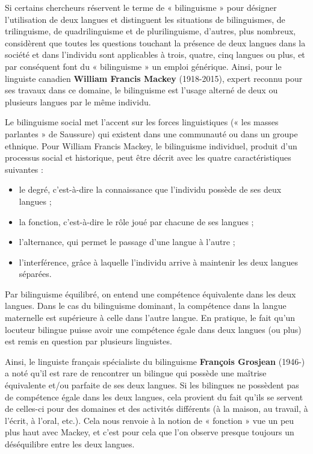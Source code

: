 Si certains chercheurs réservent le terme de « bilinguisme » pour désigner l’utilisation de deux langues et distinguent les situations de bilinguismes, de trilinguisme, de quadrilinguisme et de plurilinguisme, d’autres, plus nombreux, considèrent que toutes les questions touchant la présence de deux langues dans la société et dans l’individu sont applicables à trois, quatre, cinq langues ou plus, et par conséquent font du « bilinguisme » un emploi générique. Ainsi, pour le linguiste canadien \textbf{William Francis Mackey} (1918-2015), expert reconnu pour ses travaux dans ce domaine, le bilinguisme est l’usage alterné de deux ou plusieurs langues par le même individu.

Le bilinguisme social met l’accent sur les forces linguistiques (« les masses parlantes » de Saussure) qui existent dans une communauté ou dans un groupe ethnique. Pour William Francis Mackey, le bilinguisme individuel, produit d’un processus social et historique, peut être décrit avec les quatre caractéristiques suivantes :
\begin{itemize}
\item le degré, c’est-à-dire la connaissance que l’individu possède de ses deux langues ;
\item la fonction, c’est-à-dire le rôle joué par chacune de ses langues ;
\item l’alternance, qui permet le passage d’une langue à l’autre ;
\item l’interférence, grâce à laquelle l’individu arrive à maintenir les deux langues séparées.
\end{itemize}

Par bilinguisme équilibré, on entend une compétence équivalente dans les deux langues. Dans le cas du bilinguisme dominant, la compétence dans la langue maternelle est supérieure à celle dans l’autre langue. En pratique, le fait qu’un locuteur bilingue puisse avoir une compétence égale dans deux langues (ou plus) est remis en question par plusieurs linguistes.

Ainsi, le linguiste français spécialiste du bilinguisme \textbf{François Grosjean} (1946-) a noté qu’il est rare de rencontrer un bilingue qui possède une maîtrise équivalente et/ou parfaite de ses deux langues. Si les bilingues ne possèdent pas de compétence égale dans les deux langues, cela provient du fait qu’ils se servent de celles-ci pour des domaines et des activités différents (à la maison, au travail, à l’écrit, à l’oral, etc.). Cela nous renvoie à la notion de « fonction » vue un peu plus haut avec Mackey, et c’est pour cela que l’on observe presque toujours un déséquilibre entre les deux langues.

